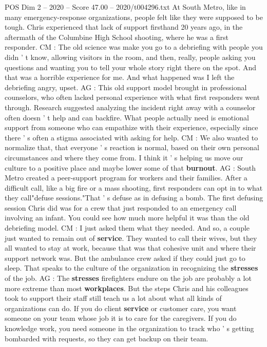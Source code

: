 \begin{textsample}{POS Dim 2 – 2020 – Score 47.00 – 2020/t004296.txt}
At South Metro, like in many emergency-response organizations, people felt like they were supposed to be tough.
Chris experienced that lack of support firsthand 20 years ago, in the aftermath of the Columbine High School shooting, where he was a first responder.
CM : The old science was make you go to a debriefing with people you didn ' t know, allowing visitors in the room, and then, really, people asking you questions and wanting you to tell your whole story right there on the spot.
And that was a horrible experience for me.
And what happened was I left the debriefing angry, upset.
AG : This old support model brought in professional counselors, who often lacked personal experience with what first responders went through.
Research suggested analyzing the incident right away with a counselor often doesn ' t help and can backfire.
What people actually need is emotional support from someone who can empathize with their experience, especially since there ' s often a stigma associated with asking for help.
CM : We also wanted to normalize that, that everyone ' s reaction is normal, based on their own personal circumstances and where they come from.
I think it ' s helping us move our culture to a positive place and maybe lower some of that \textbf{burnout}.
AG : South Metro created a peer-support program for workers and their families.
After a difficult call, like a big fire or a mass shooting, first responders can opt in to what they call"defuse sessions."That ' s defuse as in defusing a bomb.
The first defusing session Chris did was for a crew that just responded to an emergency call involving an infant.
You could see how much more helpful it was than the old debriefing model.
CM : I just asked them what they needed.
And so, a couple just wanted to remain out of \textbf{service}.
They wanted to call their wives, but they all wanted to stay at work, because that was that cohesive unit and where their support network was.
But the ambulance crew asked if they could just go to sleep.
That speaks to the culture of the organization in recognizing the \textbf{stresses} of the job.
AG : The \textbf{stresses} firefighters endure on the job are probably a lot more extreme than most \textbf{workplaces}.
But the steps Chris and his colleagues took to support their staff still teach us a lot about what all kinds of organizations can do.
If you do client \textbf{service} or customer care, you want someone on your team whose job it is to care for the caregivers.
If you do knowledge work, you need someone in the organization to track who ' s getting bombarded with requests, so they can get backup on their team.

\end{textsample}
